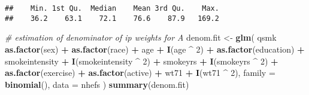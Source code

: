 \documentclass[
  10pt,
]{book}
\newenvironment{Shaded}{\begin{snugshade}}{\end{snugshade}}
\newcommand{\CommentTok}[1]{\textcolor[rgb]{0.56,0.35,0.01}{\textit{#1}}}
\newcommand{\DataTypeTok}[1]{\textcolor[rgb]{0.13,0.29,0.53}{#1}}
\newcommand{\DecValTok}[1]{\textcolor[rgb]{0.00,0.00,0.81}{#1}}
\newcommand{\KeywordTok}[1]{\textcolor[rgb]{0.13,0.29,0.53}{\textbf{#1}}}
\newcommand{\NormalTok}[1]{#1}
\newcommand{\OperatorTok}[1]{\textcolor[rgb]{0.81,0.36,0.00}{\textbf{#1}}}
\newcommand{\StringTok}[1]{\textcolor[rgb]{0.31,0.60,0.02}{#1}}
\begin{document}
\begin{verbatim}
##    Min. 1st Qu.  Median    Mean 3rd Qu.    Max. 
##    36.2    63.1    72.1    76.6    87.9   169.2
\end{verbatim}

\begin{Shaded}
\begin{Highlighting}[]
\CommentTok{# estimation of denominator of ip weights for A}
\NormalTok{denom.fit <-}
\StringTok{  }\KeywordTok{glm}\NormalTok{(}
\NormalTok{    qsmk }\OperatorTok{~}\StringTok{ }\KeywordTok{as.factor}\NormalTok{(sex) }\OperatorTok{+}\StringTok{ }\KeywordTok{as.factor}\NormalTok{(race) }\OperatorTok{+}\StringTok{ }\NormalTok{age }\OperatorTok{+}\StringTok{ }\KeywordTok{I}\NormalTok{(age }\OperatorTok{^}\StringTok{ }\DecValTok{2}\NormalTok{) }\OperatorTok{+}
\StringTok{      }\KeywordTok{as.factor}\NormalTok{(education) }\OperatorTok{+}\StringTok{ }\NormalTok{smokeintensity }\OperatorTok{+}
\StringTok{      }\KeywordTok{I}\NormalTok{(smokeintensity }\OperatorTok{^}\StringTok{ }\DecValTok{2}\NormalTok{) }\OperatorTok{+}\StringTok{ }\NormalTok{smokeyrs }\OperatorTok{+}\StringTok{ }\KeywordTok{I}\NormalTok{(smokeyrs }\OperatorTok{^}\StringTok{ }\DecValTok{2}\NormalTok{) }\OperatorTok{+}
\StringTok{      }\KeywordTok{as.factor}\NormalTok{(exercise) }\OperatorTok{+}\StringTok{ }\KeywordTok{as.factor}\NormalTok{(active) }\OperatorTok{+}\StringTok{ }\NormalTok{wt71 }\OperatorTok{+}\StringTok{ }\KeywordTok{I}\NormalTok{(wt71 }\OperatorTok{^}\StringTok{ }\DecValTok{2}\NormalTok{),}
    \DataTypeTok{family =} \KeywordTok{binomial}\NormalTok{(),}
    \DataTypeTok{data =}\NormalTok{ nhefs}
\NormalTok{  )}
\KeywordTok{summary}\NormalTok{(denom.fit)}
\end{Highlighting}
\end{Shaded}
\end{document}
